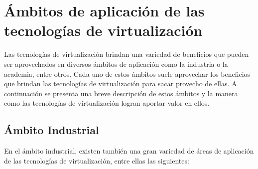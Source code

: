 \section{Ámbitos de aplicación de las tecnologías de virtualización} \label{sec:ambitos}
\vspace{5mm}
Las tecnologías de virtualización brindan una variedad de beneficios que pueden ser aprovechados en diversos ámbitos de aplicación como la industria o la academia, entre otros. Cada uno de estos ámbitos suele aprovechar los beneficios que brindan las tecnologías de virtualización para sacar provecho de ellas. A continuación se presenta una breve descripción de estos ámbitos y la manera como las tecnologías de virtualización logran aportar valor en ellos.\\

\subsection{Ámbito Industrial}
\vspace{5mm}
En el ámbito industrial, existen también una gran variedad de áreas de aplicación de las tecnologías de virtualización, entre ellas las siguientes: \\

